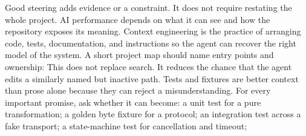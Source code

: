 {}\markdownRendererInterblockSeparator
{}\markdownRendererInterblockSeparator
{}Good steering adds evidence or a constraint. It does not require restating the\markdownRendererSoftLineBreak
{}whole project.\markdownRendererInterblockSeparator
{}\markdownRendererThematicBreak{}\markdownRendererInterblockSeparator
{}
\markdownRendererSectionEnd 
\markdownRendererSectionEnd \markdownRendererSectionBegin
{}\markdownRendererInterblockSeparator
{}AI performance depends on what it can see and how the repository exposes its\markdownRendererSoftLineBreak
{}meaning. Context engineering is the practice of arranging code, tests,\markdownRendererSoftLineBreak
{}documentation, and instructions so the agent can recover the right model of\markdownRendererSoftLineBreak
{}the system.\markdownRendererInterblockSeparator
{}\markdownRendererSectionBegin
{}\markdownRendererInterblockSeparator
{}A short project map should name entry points and ownership:\markdownRendererInterblockSeparator
{}\markdownRendererInterblockSeparator
{}This does not replace search. It reduces the chance that the agent edits a\markdownRendererSoftLineBreak
{}similarly named but inactive path.\markdownRendererInterblockSeparator
{}
\markdownRendererSectionEnd \markdownRendererSectionBegin
{}\markdownRendererInterblockSeparator
{}Tests and fixtures are better context than prose alone because they can reject\markdownRendererSoftLineBreak
{}a misunderstanding. For every important promise, ask whether it can become:\markdownRendererInterblockSeparator
{}\markdownRendererUlBegin
\markdownRendererUlItem a unit test for a pure transformation;\markdownRendererUlItemEnd 
\markdownRendererUlItem a golden byte fixture for a protocol;\markdownRendererUlItemEnd 
\markdownRendererUlItem an integration test across a fake transport;\markdownRendererUlItemEnd 
\markdownRendererUlItem a state-machine test for cancellation and timeout;\markdownRendererUlItemEnd 
